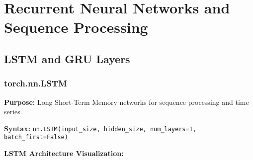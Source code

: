 \documentclass[11pt,a4paper]{book}
\begin{document}
\chapter{Recurrent Neural Networks and Sequence Processing}

\section{LSTM and GRU Layers}

\subsection{torch.nn.LSTM}

\textbf{Purpose:} Long Short-Term Memory networks for sequence processing and time series.

\textbf{Syntax:} \texttt{nn.LSTM(input\_size, hidden\_size, num\_layers=1, batch\_first=False)}

\textbf{LSTM Architecture Visualization:}
\end{document}
